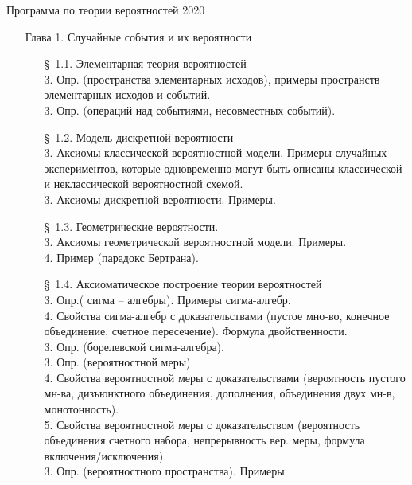 \documentclass[10pt]{amsart}
\begin{document}
\thispagestyle{empty}

\begin{center}
    {\Large Программа по теории вероятностей 2020}
\end{center}


\begin{enumerate}
\item[Глава 1.] Случайные события и их вероятности \\
\begin{enumerate}
\item[\S\, 1.1.] Элементарная теория вероятностей \\
3. Опр. (пространства элементарных исходов), примеры пространств элементарных исходов и событий. \\
3. Опр. (операций над событиями, несовместных событий). \\
\item[\S\, 1.2.] Модель дискретной вероятности \\
3. Аксиомы классической вероятностной модели. Примеры случайных экспериментов, которые одновременно могут быть описаны классической и неклассической вероятностной схемой. \\
3. Аксиомы дискретной вероятности. Примеры. \\
\item[\S\, 1.3.] Геометрические вероятности. \\
3.  Аксиомы геометрической вероятностной модели. Примеры. \\
4. Пример (парадокс Бертрана). \\ 

\item[\S\, 1.4.] Аксиоматическое построение теории вероятностей \\ 
3.  Опр.( сигма – алгебры). Примеры сигма-алгебр. \\
4. Свойства сигма-алгебр с доказательствами (пустое мно-во, конечное объединение, счетное пересечение). Формула двойственности. \\
3. Опр. (борелевской сигма-алгебра). \\
3. Опр. (вероятностной меры). \\
4.  Свойства вероятностной меры с доказательствами (вероятность пустого мн-ва, дизъюнктного объединения, дополнения, объединения двух мн-в, монотонность). \\
5. Свойства  вероятностной меры с доказательством (вероятность объединения счетного набора, непрерывность вер. меры, формула включения/исключения). \\
3. Опр. (вероятностного пространства). Примеры. \\


\end{enumerate}
\end{enumerate}
\end{document}
